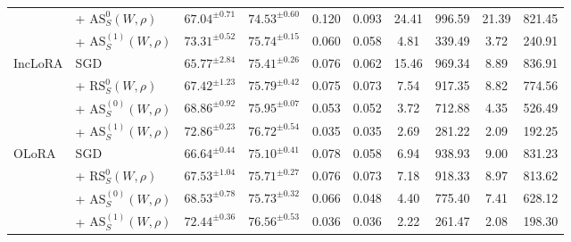 \documentclass{article}
\theoremstyle{plain}
\theoremstyle{definition}
\theoremstyle{remark}
\begin{document}
{\begin{table}[h]
{\begin{tabular}{@{}p{1.15cm} p{1.8cm} c c c c c c c c@{}}
& + $\mathrm{AS}^{0}_S(W,\rho)$    &$67.04^{\pm 0.71}$ & $74.53^{\pm 0.60}$ & 0.120  & 0.093 & 24.41   & 996.59   & 21.39  & 821.45   \\
 & + $\mathrm{AS}^{(1)}_S(W,\rho)$   &$73.31^{\pm 0.52}$ & $75.74^{\pm 0.15}$  & 0.060  &0.058  & 4.81    & 339.49   & 3.72   & 240.91   \\
\midrule
\multirow{4}{*}{{IncLoRA}}
& SGD    &$65.77^{\pm 2.84}$  &$75.41^{\pm 0.26}$ & 0.076    & 0.062 & 15.46 & 969.34  & 8.89  & 836.91 \\
& + $\mathrm{RS}^{0}_S(W,\rho)$ & $67.42^{\pm 1.23}$ & $75.79^{\pm 0.42}$  &0.075 &0.073 &7.54 &917.35 &8.82 &774.56\\
& + $\mathrm{AS}^{(0)}_S(W,\rho)$    &$68.86^{\pm 0.92}$ & $75.95^{\pm 0.07}$  & 0.053   & 0.052 & 3.72    & 712.88   & 4.35   & 526.49   \\
 &+ $\mathrm{AS}^{(1)}_S(W,\rho)$  &$72.86^{\pm 0.23}$ & $76.72^{\pm 0.54}$  & 0.035   & 0.035 & 2.69    & 281.22   & 2.09   & 192.25   \\
\midrule
\multirow{4}{*}{{OLoRA}}
& SGD    &$66.64^{\pm 0.44}$ & $75.10^{\pm 0.41}$  & 0.078   & 0.058 & 6.94    & 938.93   & 9.00   & 831.23   \\
& + $\mathrm{RS}^{0}_S(W,\rho)$  & $67.53^{\pm 1.04}$ & $75.71^{\pm 0.27}$  &0.076 &0.073 &7.18 &918.33 &8.97 &813.62\\
& + $\mathrm{AS}^{(0)}_S(W,\rho)$     &$68.53^{\pm 0.78}$ & $75.73^{\pm 0.32}$  & 0.066   & 0.048 & 4.40    & 775.40   & 7.41   & 628.12   \\
 & + $\mathrm{AS}^{(1)}_S(W,\rho)$  &$72.44^{\pm 0.36}$ & $76.56^{\pm 0.53}$  & 0.036   & 0.036 & 2.22    & 261.47   & 2.08   & 198.30\\
\bottomrule
\end{tabular}
}
\end{table}
}
\end{document}
